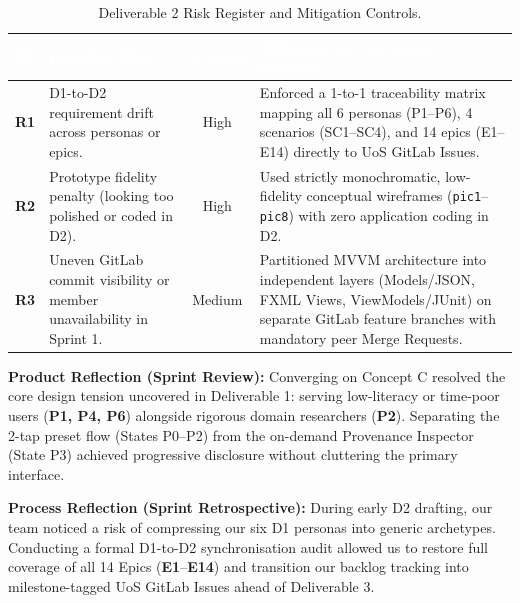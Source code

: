 \documentclass[12pt, a4paper]{article}
\begin{document}
\begin{table}[H]
\centering
\small
\renewcommand{\arraystretch}{1.35}
\begin{tabularx}{\textwidth}{@{} p{1.2cm} p{3.4cm} c X @{}}
\toprule
\rowcolor{AcademicNavy}
\textcolor{white}{\textbf{ID}} & \textcolor{white}{\textbf{Identified Risk}} & \textcolor{white}{\textbf{Severity}} & \textcolor{white}{\textbf{Mitigation \& Contingency Strategy}} \\
\midrule
\textbf{R1} & D1-to-D2 requirement drift across personas or epics. & High & Enforced a 1-to-1 traceability matrix mapping all 6 personas (P1--P6), 4 scenarios (SC1--SC4), and 14 epics (E1--E14) directly to UoS GitLab Issues. \\
\rowcolor{RowAlt}
\textbf{R2} & Prototype fidelity penalty (looking too polished or coded in D2). & High & Used strictly monochromatic, low-fidelity conceptual wireframes (\texttt{pic1}--\texttt{pic8}) with zero application coding in D2. \\
\textbf{R3} & Uneven GitLab commit visibility or member unavailability in Sprint 1. & Medium & Partitioned MVVM architecture into independent layers (Models/JSON, FXML Views, ViewModels/JUnit) on separate GitLab feature branches with mandatory peer Merge Requests. \\
\bottomrule
\end{tabularx}
\caption{Deliverable 2 Risk Register and Mitigation Controls.}
\label{tab:risk-log}
\end{table}

\textbf{Product Reflection (Sprint Review):} Converging on Concept C resolved the core design tension uncovered in Deliverable 1: serving low-literacy or time-poor users (\textbf{P1, P4, P6}) alongside rigorous domain researchers (\textbf{P2}). Separating the 2-tap preset flow (States P0--P2) from the on-demand Provenance Inspector (State P3) achieved progressive disclosure without cluttering the primary interface.

\textbf{Process Reflection (Sprint Retrospective):} During early D2 drafting, our team noticed a risk of compressing our six D1 personas into generic archetypes. Conducting a formal D1-to-D2 synchronisation audit allowed us to restore full coverage of all 14 Epics (\textbf{E1}--\textbf{E14}) and transition our backlog tracking into milestone-tagged UoS GitLab Issues ahead of Deliverable 3.

\end{document}
